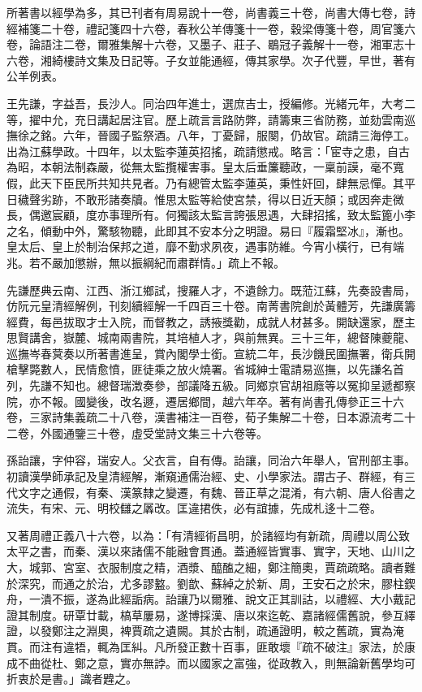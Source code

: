 \begin{pinyinscope}
所著書以經學為多，其已刊者有周易說十一卷，尚書義三十卷，尚書大傳七卷，詩經補箋二十卷，禮記箋四十六卷，春秋公羊傳箋十一卷，穀梁傳箋十卷，周官箋六卷，論語注二卷，爾雅集解十六卷，又墨子、莊子、鶡冠子義解十一卷，湘軍志十六卷，湘綺樓詩文集及日記等。子女並能通經，傳其家學。次子代豐，早世，著有公羊例表。

王先謙，字益吾，長沙人。同治四年進士，選庶吉士，授編修。光緒元年，大考二等，擢中允，充日講起居注官。歷上疏言言路防弊，請籌東三省防務，並劾雲南巡撫徐之銘。六年，晉國子監祭酒。八年，丁憂歸，服闋，仍故官。疏請三海停工。出為江蘇學政。十四年，以太監李蓮英招搖，疏請懲戒。略言：「宦寺之患，自古為昭，本朝法制森嚴，從無太監攬權害事。皇太后垂簾聽政，一稟前謨，毫不寬假，此天下臣民所共知共見者。乃有總管太監李蓮英，秉性奸回，肆無忌憚。其平日穢聲劣跡，不敢形諸奏牘。惟思太監等給使宮禁，得以日近天顏；或因奔走微長，偶邀宸顧，度亦事理所有。何獨該太監言誇張恩遇，大肆招搖，致太監篦小李之名，傾動中外，驚駭物聽，此即其不安本分之明證。易曰『履霜堅冰』，漸也。皇太后、皇上於制治保邦之道，靡不勤求夙夜，遇事防維。今宵小橫行，已有端兆。若不嚴加懲辦，無以振綱紀而肅群情。」疏上不報。

先謙歷典云南、江西、浙江鄉試，搜羅人才，不遺餘力。既蒞江蘇，先奏設書局，仿阮元皇清經解例，刊刻續經解一千四百三十卷。南菁書院創於黃體芳，先謙廣籌經費，每邑拔取才士入院，而督教之，誘掖獎勸，成就人材甚多。開缺還家，歷主思賢講舍，嶽麓、城南兩書院，其培植人才，與前無異。三十三年，總督陳夔龍、巡撫岑春蓂奏以所著書進呈，賞內閣學士銜。宣統二年，長沙饑民圍撫署，衛兵開槍擊斃數人，民情愈憤，匪徒乘之放火燒署。省城紳士電請易巡撫，以先謙名首列，先謙不知也。總督瑞澂奏參，部議降五級。同鄉京官胡祖廕等以冤抑呈遞都察院，亦不報。國變後，改名遯，遷居鄉間，越六年卒。著有尚書孔傳參正三十六卷，三家詩集義疏二十八卷，漢書補注一百卷，荀子集解二十卷，日本源流考二十二卷，外國通鑒三十卷，虛受堂詩文集三十六卷等。

孫詒讓，字仲容，瑞安人。父衣言，自有傳。詒讓，同治六年舉人，官刑部主事。初讀漢學師承記及皇清經解，漸窺通儒治經、史、小學家法。謂古子、群經，有三代文字之通假，有秦、漢篆隸之變遷，有魏、晉正草之混淆，有六朝、唐人俗書之流失，有宋、元、明校讎之羼改。匡違捃佚，必有誼據，先成札迻十二卷。

又著周禮正義八十六卷，以為：「有清經術昌明，於諸經均有新疏，周禮以周公致太平之書，而秦、漢以來諸儒不能融會貫通。蓋通經皆實事、實字，天地、山川之大，城郭、宮室、衣服制度之精，酒漿、醯醢之細，鄭注簡奧，賈疏疏略。讀者難於深究，而通之於治，尤多謬盭。劉歆、蘇綽之於新、周，王安石之於宋，膠柱鍥舟，一潰不振，遂為此經詬病。詒讓乃以爾雅、說文正其訓詁，以禮經、大小戴記證其制度。研覃廿載，槁草屢易，遂博採漢、唐以來迄乾、嘉諸經儒舊說，參互繹證，以發鄭注之淵奧，裨賈疏之遺闕。其於古制，疏通證明，較之舊疏，實為淹貫。而注有違牾，輒為匡糾。凡所發正數十百事，匪敢壞『疏不破注』家法，於康成不曲從杜、鄭之意，實亦無誖。而以國家之富強，從政教入，則無論新舊學均可折衷於是書。」識者韙之。


\end{pinyinscope}
